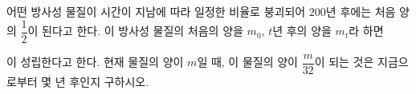 어떤 방사성 물질이 시간이 지남에 따라 일정한 비율로 붕괴되어 $200$년 후에는 처음 양의 $\dfrac{1}{2}$이 된다고 한다. 이 방사성 물질의 처음의 양을 $m_0$, $t$년 후의 양을 $m_t$라 하면 \par\smallskip{}\par\smallskip\noindent 이 성립한다고 한다. 현재 물질의 양이 $m$일 때, 이 물질의 양이 $\dfrac{m}{32}$이 되는 것은 지금으로부터 몇 년 후인지 구하시오.
